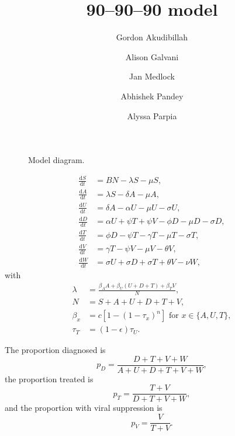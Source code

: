 \documentclass{article}
\title{90--90--90 model}
\author{
  Gordon Akudibillah
  \and
  Alison Galvani
  \and
  Jan Medlock
  \and
  Abhishek Pandey
  \and
  Alyssa Parpia}
\newcommand{\md}{\mathrm{d}}
\begin{document}
\maketitle


\begin{figure}
  \centering
  
  \caption{Model diagram.}
\end{figure}


\begin{equation}
  \label{model_eqns}
  \begin{split}
    \frac{\md S}{\md t} &= B N - \lambda S - \mu S,
    \\
    \frac{\md A}{\md t} &= \lambda S - \delta A - \mu A,
    \\
    \frac{\md U}{\md t} &= \delta A - \alpha U - \mu U - \sigma U,
    \\
    \frac{\md D}{\md t} &=  \alpha U + \psi T + \psi V
    - \phi D - \mu D - \sigma D,
    \\
    \frac{\md T}{\md t} &= \phi D - \psi T - \gamma T - \mu T
    - \sigma T,
    \\
    \frac{\md V}{\md t} &= \gamma T - \psi V - \mu V - \theta V,
    \\
    \frac{\md W}{\md t} &= \sigma U + \sigma D + \sigma T + \theta V -
    \nu W,
  \end{split}
\end{equation}
with
\begin{equation}
  \label{force_of_infection}
  \begin{split}
    \lambda &= \frac{\beta_A A + \beta_U (U + D + T) + \beta_T V}{N},
    \\
    N &= S + A + U + D + T + V,
    \\
    \beta_x &= c \left[1 - (1 - \tau_x)^n\right]
    \text{ for $x \in \{A, U, T\}$},
    \\
    \tau_T &= (1 - \epsilon) \tau_U.
  \end{split}
\end{equation}

The proportion diagnosed is
\begin{equation}
  p_D = \frac{D + T + V + W}{A + U + D + T + V + W},
\end{equation}
the proportion treated is
\begin{equation}
  p_T = \frac{T + V}{D + T + V + W},
\end{equation}
and the proportion with viral suppression is
\begin{equation}
  p_V = \frac{V}{T + V}.
\end{equation}
\end{document}
